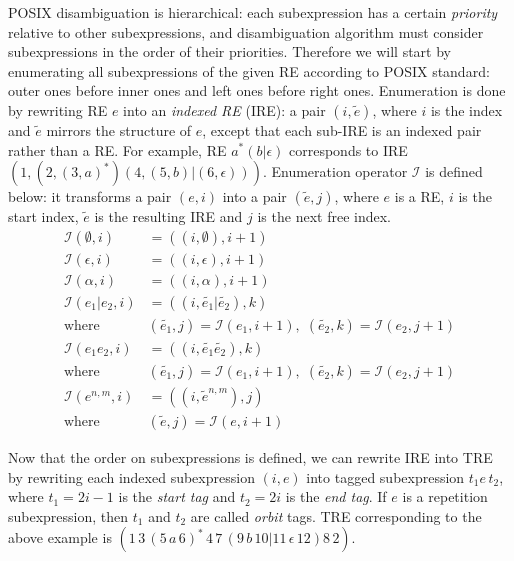\documentclass{article}
\newcommand{\Xeq}{\!=\!}
\newcommand{\XI}{\mathcal{I}}
\theoremstyle{definition}
\begin{document}
\begin{multicols}{2}
POSIX disambiguation is hierarchical:
each subexpression has a certain \emph{priority} relative to other subexpressions,
and disambiguation algorithm must consider subexpressions in the order of their priorities.
Therefore we will start by enumerating all subexpressions of the given RE according to POSIX standard:
outer ones before inner ones and left ones before right ones.
Enumeration is done by rewriting RE $e$ into an \emph{indexed RE} (IRE): a pair $(i, \widetilde{e})$,
where $i$ is the index and $\widetilde{e}$ mirrors the structure of $e$,
except that each sub-IRE is an indexed pair rather than a RE.
For example, RE $a^* (b | \epsilon)$ corresponds to IRE
$(1,
    (2, (3, a)^*)
    (4, (5, b) | (6, \epsilon))
)$.
Enumeration operator $\XI$ is defined below:
it transforms a pair $(e, i)$ into a pair $(\widetilde{e}, j)$,
where $e$ is a RE, $i$ is the start index, $\widetilde{e}$ is the resulting IRE and $j$ is the next free index.
    \begin{align*}
        \XI(\emptyset, i) &= ((i, \emptyset), i \!+\! 1) \\
        \XI(\epsilon, i) &= ((i, \epsilon), i \!+\! 1) \\
        \XI(\alpha, i) &= ((i, \alpha), i \!+\! 1) \\
        \XI(e_1 | e_2, i) &= ((i, \widetilde{e_1} | \widetilde{e_2}), k) \\
            \text{where }
            & (\widetilde{e_1}, j) \Xeq \XI(e_1, i \!+\! 1),
            \; (\widetilde{e_2}, k) \Xeq \XI(e_2, j \!+\! 1) \\
        \XI(e_1 e_2, i) &= ((i, \widetilde{e_1} \widetilde{e_2}), k) \\
            \text{where }
            & (\widetilde{e_1}, j) \Xeq \XI(e_1, i \!+\! 1),
            \; (\widetilde{e_2}, k) \Xeq \XI(e_2, j \!+\! 1) \\
        \XI(e^{n,m}, i) &= ((i, \widetilde{e}^{n,m}), j) \\
            \text{where } & (\widetilde{e}, j) \Xeq \XI(e, i \!+\! 1)
    \end{align*}

Now that the order on subexpressions is defined, we can
rewrite IRE into TRE by rewriting each indexed subexpression $(i, e)$
into tagged subexpression $t_1 e \, t_2$, where $t_1 \Xeq 2i \!-\! 1$ is the \emph{start tag}
and $t_2 \Xeq 2i$ is the \emph{end tag}.
If $e$ is a repetition subexpression, then $t_1$ and $t_2$ are called \emph{orbit} tags.
TRE corresponding to the above example is
$(1\,
    3\, (5\, a \,6)^* \,4\,
    7\, (9\, b \,10 | 11\, \epsilon \,12) 8\,
2)$.
\\


\end{multicols}
\end{document}
